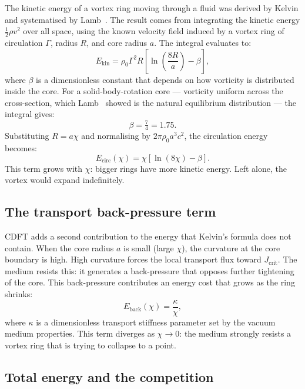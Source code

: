 \documentclass[11pt]{article}
\begin{document}
The kinetic energy of a vortex ring moving through a fluid was derived by Kelvin
and systematised by Lamb~\cite{Lamb1932}. The result comes from integrating the
kinetic energy $\frac{1}{2}\rho v^2$ over all space, using the known velocity
field induced by a vortex ring of circulation $\Gamma$, radius $R$, and core
radius $a$. The integral evaluates to:
\begin{equation}
  E_\text{kin} = \rho_0 \Gamma^2 R
  \left[\ln\!\left(\frac{8R}{a}\right) - \beta\right],
  \label{eq:Ekin}
\end{equation}
where $\beta$ is a dimensionless constant that depends on how vorticity is
distributed inside the core. For a solid-body-rotation core --- vorticity
uniform across the cross-section, which Lamb~\cite{Lamb1932} showed is the
natural equilibrium distribution --- the integral gives:
\begin{equation}
  \beta = \tfrac{7}{4} = 1.75.
  \label{eq:beta}
\end{equation}
Substituting $R = a\chi$ and normalising by $2\pi\rho_0 a^3 c^2$, the
circulation energy becomes:
\begin{equation}
  E_\text{circ}(\chi) = \chi\left[\ln(8\chi) - \beta\right].
  \label{eq:Ecirc}
\end{equation}
This term grows with $\chi$: bigger rings have more kinetic energy. Left alone,
the vortex would expand indefinitely.

\subsection{The transport back-pressure term}

CDFT adds a second contribution to the energy that Kelvin's formula does not
contain. When the core radius $a$ is small (large $\chi$), the curvature at the
core boundary is high. High curvature forces the local transport flux toward
$J_\text{crit}$. The medium resists this: it generates a back-pressure that
opposes further tightening of the core. This back-pressure contributes an energy
cost that grows as the ring shrinks:
\begin{equation}
  E_\text{back}(\chi) = \frac{\kappa}{\chi},
  \label{eq:Eback}
\end{equation}
where $\kappa$ is a dimensionless transport stiffness parameter set by the vacuum
medium properties. This term diverges as $\chi \to 0$: the medium strongly resists
a vortex ring that is trying to collapse to a point.

\subsection{Total energy and the competition}
\end{document}
